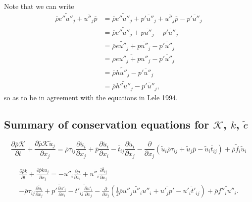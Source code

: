 \documentclass[oneside,a4paper,11pt]{report}
\newcommand{\rhoavg}{\overline{\rho}}
\newcommand{\pavg}{\overline{p}}
\newcommand{\tavg}{\overline{t}}
\newcommand{\pfluc}{p'}
\newcommand{\tfluc}{t'}
\newcommand{\ufluc}{u'}
\newcommand{\rs}{\tau}          %
\newcommand{\eavgf}{\widetilde{e}}
\newcommand{\favgf}{\widetilde{f}}
\newcommand{\uavgf}{\widetilde{u}}
\newcommand{\eflucf}{e''}
\newcommand{\fflucf}{f''}
\newcommand{\uflucf}{u''}
\begin{document}
Note that we can write
\begin{align}
    \rhoavg \widetilde{ \eflucf \uflucf_j } + \overline{ \uflucf_j } \pavg &= \rhoavg \widetilde{ \eflucf \uflucf_j } + \overline{ \pfluc \uflucf_j } + \overline{ \uflucf_j } \pavg - \overline{ \pfluc \uflucf_j } \nonumber \\ 
    &= \rhoavg \widetilde{ \eflucf \uflucf_j } + \overline{ p \uflucf_j } - \overline{ \pfluc \uflucf_j } \nonumber \\
    &=  \rhoavg \widetilde{ e \uflucf_j} + \overline{ p \uflucf_j } - \overline{ \pfluc \uflucf_j } \nonumber \\
    &=\overline{ \rho e\uflucf_j + p\uflucf_j} - \overline{ \pfluc \uflucf_j } \nonumber \\
    &= \rhoavg \widetilde{ h \uflucf_j} - \overline{ \pfluc \uflucf_j } \nonumber \\
    &= \rhoavg \widetilde{ h'' \uflucf_j } - \overline{ \pfluc \uflucf_j } ,
\end{align}
so as to be in agreement with the equations in Lele 1994.

\subsection{Summary of conservation equations for $\mathcal{K}$, $k$, $\eavgf$}
\begin{equation}
    \frac{ \partial \rhoavg \mathcal{K} }{ \partial t} + \frac{ \partial \rhoavg \mathcal{K} \uavgf_j }{ \partial x_j} = \rhoavg \rs_{ij} \frac{ \partial \uavgf_i }{ \partial x_j } + \pavg \frac{ \partial \uavgf_i }{ \partial x_i } - \tavg_{ij} \frac{ \partial \uavgf_i }{ \partial x_j } - \frac{\partial}{\partial x_j} \left ( \uavgf_i \rhoavg \rs_{ij} + \uavgf_j \pavg - \uavgf_i \tavg_{ij} \right ) + \rhoavg \favgf_i \uavgf_i
    \end{equation}

\begin{multline}
    \frac{ \partial \rhoavg k }{ \partial t}  + \frac{ \partial \rhoavg k \uavgf_j }{ \partial x_j } = - \overline{ \uflucf_i } \frac{ \partial \pavg }{ \partial x_i } + \overline{ \uflucf_i } \frac{ \partial \tavg_{ij} }{ \partial x_j } \\
    - \rhoavg \rs_{ij} \frac{ \partial \uavgf_i }{ \partial x_j}  + \overline{ \pfluc \frac{ \partial \ufluc_i } { \partial x_i } } - \overline{ \tfluc_{ij} \frac{ \partial \ufluc_i }{ \partial x_j } } - \frac{\partial}{ \partial x_j} \left ( \frac{1}{2} \rhoavg \widetilde{ \uflucf_j \uflucf_i \uflucf_i } + \overline{ \ufluc_j \pfluc }  - \overline{ \ufluc_i \tfluc_{ij} } \right ) + \rhoavg \widetilde{ \fflucf_i \uflucf_i }.
\end{multline}
\end{document}
